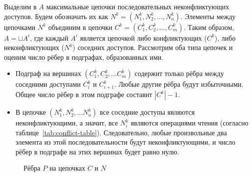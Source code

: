 Выделим в $A$ максимальные цепочки последовательных неконфликтующих доступов. Будем обозначать их как $N^k = (N^k_1, N^k_2, \ldots, N^k_n)$. Элементы между цепочками $N^k$ объединим в цепочки $C^k = (C^k_1, C^k_2, \ldots, C^k_m)$. Таким образом, $A = \sqcup A^i$, где каждый $A^i$ является цепочкой либо конфликтующих ($C^k$), либо неконфликтующих ($N^k$) соседних доступов. Рассмотрим оба типа цепочек и оценим число рёбер в подграфах, образованных ими.

\begin{itemize}
    \item Подграф на вершинах $(C^k_1, C^k_2, \dots C^k_m)$ содержит только рёбра между соседними доступами $C^k_i$ и $C^k_{i+1}$. Любые другие рёбра будут избыточными. Общее число рёбер в этом подграфе составит $|C^k| - 1$.
    \item В цепочке $(N^k_1, N^k_2, \dots N^k_n)$ все соседние доступы являются неконфликтующими, а значит, все $N^k_i$ являются операциями чтения (согласно таблице~\ref{tab:conflict-table}). Следовательно, любые произвольные два элемента из этой последовательности будут неконфликтующими, и число рёбер в подграфе на этих вершинах будет равно нулю.
\end{itemize}

\begin{figure}[H]
    \centering
    \caption{Рёбра $P$ на цепочках $C$ и $N$}
    \label{fig:cn-chains}
\end{figure}

